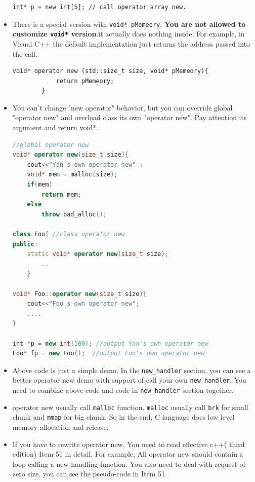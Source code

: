 \documentclass[a4paper,11pt,twoside]{book}
\begin{document}
\begin{itemize}
\begin{lstlisting}[numbers=none]
int* p = new int[5]; // call operator array new.
\end{lstlisting}

	\item There is a special version with \texttt{void* pMemeory}. \textbf{You are not allowed to customize \texttt{void*} version}.it actually does nothing inside. For example, in Visual C++ the default implementation just returns the address passed into the call.
\begin{lstlisting}[numbers=none]
void* operator new (std::size_t size, void* pMemeory){
			return pMemeory;
		}
\end{lstlisting}

	
	\item You can't change "new operator" behavior, but you can override global "operator new" and overload class its own "operator new". Pay attention its argument and return void*. 
	
\begin{lstlisting}[frame=single, language=c++, mathescape=true]
//global operator new
void* operator new(size_t size){
	cout<<"Yan's own operator new" ;
	void* mem = malloc(size);
	if(mem)
		return mem;
	else
		throw bad_alloc();
	
class Foo{ //class operator new
public:
	static void* operator new(size_t size);
		..
	}
	
void* Foo::operator new(size_t size){
	cout<<"Foo's own operator new";
	....
}
	
int *p = new int[100]; //output Yan's own operator new
Foo* fp = new Foo();  //output Foo's own operator new
\end{lstlisting}
	
	\item Above code is just a simple demo, In the \texttt{new\_handler} section, you can see a better operator new demo with support of call your own \texttt{new\_handler}. You need to combine above code and code in \texttt{new\_handler} section together. 
	
	\item operator new usually call \texttt{malloc} function. \texttt{malloc} usually call \texttt{brk} for small chunk and \texttt{mmap} for big chunk. So in the end, C language does low level memory allocation and release.
	

	
	\item If you have to rewrite operator new, You need to read  effective c++( third edition) Item 51 in detail. For example, All operator new should contain a loop calling a new-handling function.  You also need to deal with request of zero size. you can see the pseudo-code in Item 51.
	

\end{itemize}
\end{document}
